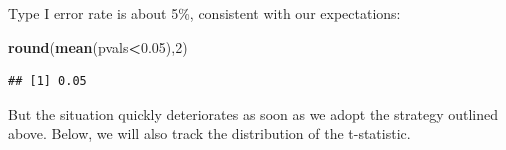 \documentclass[12pt,]{krantz}
\newenvironment{Shaded}{\begin{snugshade}}{\end{snugshade}}
\newcommand{\CommentTok}[1]{\textcolor[rgb]{0.56,0.35,0.01}{\textit{#1}}}
\newcommand{\ControlFlowTok}[1]{\textcolor[rgb]{0.13,0.29,0.53}{\textbf{#1}}}
\newcommand{\DataTypeTok}[1]{\textcolor[rgb]{0.13,0.29,0.53}{#1}}
\newcommand{\DecValTok}[1]{\textcolor[rgb]{0.00,0.00,0.81}{#1}}
\newcommand{\FloatTok}[1]{\textcolor[rgb]{0.00,0.00,0.81}{#1}}
\newcommand{\KeywordTok}[1]{\textcolor[rgb]{0.13,0.29,0.53}{\textbf{#1}}}
\newcommand{\NormalTok}[1]{#1}
\newcommand{\OperatorTok}[1]{\textcolor[rgb]{0.81,0.36,0.00}{\textbf{#1}}}
\newcommand{\OtherTok}[1]{\textcolor[rgb]{0.56,0.35,0.01}{#1}}
\begin{document}
\begin{Shaded}
\end{Shaded}

Type I error rate is about 5\%, consistent with our expectations:

\begin{Shaded}
\begin{Highlighting}[]
\KeywordTok{round}\NormalTok{(}\KeywordTok{mean}\NormalTok{(pvals}\OperatorTok{<}\FloatTok{0.05}\NormalTok{),}\DecValTok{2}\NormalTok{)}
\end{Highlighting}
\end{Shaded}

\begin{verbatim}
## [1] 0.05
\end{verbatim}

But the situation quickly deteriorates as soon as we adopt the strategy outlined above. Below, we will also track the distribution of the t-statistic.
\end{document}
